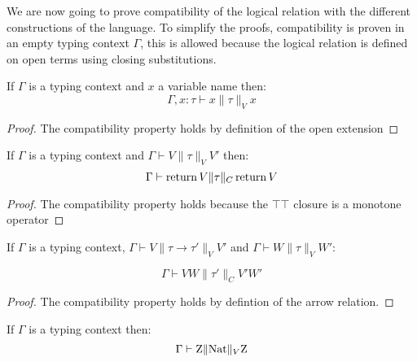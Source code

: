 We are now going to prove compatibility of the logical relation with 
the different constructions of the language. To simplify the proofs, 
compatibility is proven in an empty typing context $\Gamma$, this is allowed 
because the logical relation is defined on open terms using closing 
substitutions.

\begin{alemma}
    If $\Gamma$ is a typing context and $x$ a variable name then:
    \begin{equation*}
        \Gamma, x:\tau \vdash x \| \tau \|_V x 
    \end{equation*}
\end{alemma}

\begin{proof}
    The compatibility property holds by definition of the open extension
\end{proof}

\begin{alemma}
    If $\Gamma$ is a typing context and $\Gamma \vdash V \| \tau \|_V V'$ then:
    \begin{equation*}
        \Gamma \vdash \operatorname{return} V \| \tau \|_C \operatorname{return} V
    \end{equation*}
\end{alemma}

\begin{proof}
    The compatibility property holds because the $\top\top$ closure 
    is a monotone operator
\end{proof}

\begin{alemma}
    If $\Gamma$ is a typing context,
    $\Gamma \vdash V \| \tau \to \tau' \|_V V'$ 
    and $\Gamma \vdash W \| \tau \|_V W'$:

    \begin{equation*}
        \Gamma \vdash VW \| \tau' \|_C V'W'
    \end{equation*}
\end{alemma}

\begin{proof}
    The compatibility property holds by defintion of the arrow relation.
\end{proof}

\begin{alemma}
    If $\Gamma$ is a typing context then:
    \begin{equation*}
        \Gamma \vdash \textnormal{Z} \| \textnormal{Nat} \|_V \textnormal{Z} 
    \end{equation*}
\end{alemma}

